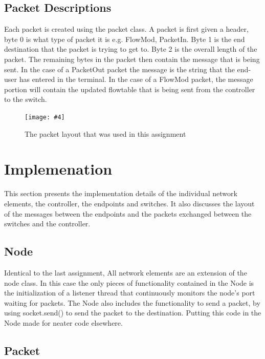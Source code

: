 \documentclass{article}
\newcommand{\includefigure}[4]{
\begin{figure}[htb]
\centering
\texttt{[image: \#4]}
\captionsetup{width=.8\linewidth} 
\caption[#2]{#3}
\label{#1}
\end{figure}
}
\begin{document}
\subsection{Packet Descriptions}
Each packet is created using the packet class. A packet is first given a header, byte 0 is what type of packet it is e.g. FlowMod, PacketIn. 
\newline
Byte 1 is the end destination that the packet is trying to get to.
\newline
Byte 2 is the overall length of the packet.
\newline
\newline
The remaining bytes in the packet then contain the message that is being sent. In the case of a PacketOut packet the message is the string that the end-user has entered in the terminal. In the case of a FlowMod packet, the message portion will contain the updated flowtable that is being sent from the controller to the switch.

\includefigure{PacketLayout}{Graphical Packet Layout}{The packet layout that was used in this assignment}{Packet-Layout.PNG}
\pagebreak
\section{Implemenation}

This section presents the implementation details of the individual network elements, the controller, the endpoints and switches. It also discusses the layout of the messages between the endpoints and the packets exchanged between the switches and the controller.

\subsection{Node}

Identical to the last assignment, All network elements are an extension of the node class. In this case the only pieces of functionality contained in the Node is the initialization of a listener thread that continuously monitors the node's port waiting for packets. The Node also includes the functionality to send a packet, by using socket.send() to send the packet to the destination. Putting this code in the Node made for neater code elsewhere.

\subsection{Packet}
\end{document}
